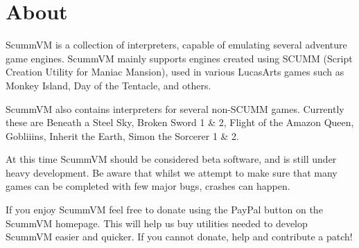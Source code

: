 


\section{About}

ScummVM is a collection of interpreters, capable of emulating several
adventure game engines. ScummVM mainly supports engines created using 
SCUMM (Script Creation Utility for Maniac Mansion), used in various
LucasArts games such as Monkey Island, Day of the Tentacle, and others.

ScummVM also contains interpreters for several non-SCUMM games. Currently
these are Beneath a Steel Sky, Broken Sword 1 \& 2, Flight of the Amazon Queen,
Gobliiins, Inherit the Earth, Simon the Sorcerer 1 \& 2.

At this time ScummVM should be considered beta software, and is still
under heavy development. Be aware that whilst we attempt to make sure
that many games can be completed with few major bugs, crashes can happen.

If you enjoy ScummVM feel free to donate using the PayPal button on the
ScummVM homepage. This will help us buy utilities needed to develop ScummVM
easier and quicker. If you cannot donate, help and contribute a patch!
